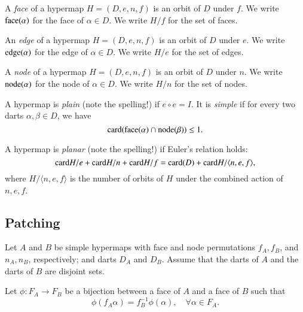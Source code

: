 \begin{definition}  A {\it face} of a hypermap $H=(D,e,n,f)$ is an orbit of $D$
under $f$.  We write ${\operatorname{face}}(\alpha)$ for the face of
$\alpha\in D$.  We write $H/f$ for the set of faces.
\end{definition}

\begin{definition}  An {\it edge} of a hypermap $H=(D,e,n,f)$ is an orbit of $D$
under $e$.  We write ${\operatorname{edge}}(\alpha)$ for the edge of
$\alpha\in D$.  We write $H/e$ for the set of edges.
\end{definition}

\begin{definition}  A {\it node} of a hypermap $H=(D,e,n,f)$ is an orbit of $D$
under $n$.  We write ${\operatorname{node}}(\alpha)$ for the node of
$\alpha\in D$.  We write $H/n$ for the set of nodes.
\end{definition}

\begin{definition} A hypermap is {\it plain} (note the spelling!)
if $e\circ e=I$.  It is {\it simple} if for every two darts
$\alpha,\beta\in D$, we have
    $${\operatorname{card}}{({\operatorname{face}}(\alpha) \cap {\operatorname{node}}(\beta))} \le 1.$$
\end{definition}

\begin{definition} A hypermap is {\it planar} (note the spelling!)
if Euler's relation holds:
    $$
    {\operatorname{card}}{H/e} + {\operatorname{card}}{H/n} + {\operatorname{card}}{H/f} = {\operatorname{card}}(D) + {\operatorname{card}}{H/\langle
    n,e,f\rangle},
    $$
where $H/\langle n,e,f\rangle$ is the number of orbits of $H$
under the combined action of $n,e,f$.
\end{definition}

\subsection{Patching}

Let $A$ and $B$ be simple hypermaps with face and node
permutations
    $f_A,f_B$, and $n_A,n_B$, respectively; and darts $D_A$ and
    $D_B$.  Assume that the darts of $A$ and the darts of $B$ are
    disjoint sets.

Let $\phi:F_A\to F_B$ be a bijection between a face of $A$ and a
face of $B$ such that
    $$
    \phi(f_A \alpha) = f_B^{-1}\phi(\alpha),\quad \forall
    \alpha\in F_A.
    $$

